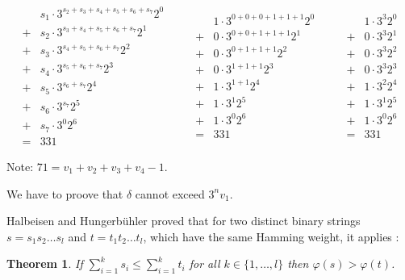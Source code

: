 \documentclass[12pt]{amsart}
\newtheorem{theorem}{Theorem}
\theoremstyle{definition}
\begin{document}
\[
\begin{array}{ll}
&s_1\cdot3^{s_2+s_3+s_4+s_5+s_6+s_7}2^0\\
+&s_2\cdot3^{s_3+s_4+s_5+s_6+s_7}2^1\\
+&s_3\cdot3^{s_4+s_5+s_6+s_7}2^2\\
+&s_4\cdot3^{s_5+s_6+s_7}2^3\\
+&s_5\cdot3^{s_6+s_7}2^4\\
+&s_6\cdot3^{s_7}2^5\\
+&s_7\cdot3^{0}2^6\\
=&331
\end{array}\qquad
\begin{array}{ll}
&1\cdot3^{0+0+0+1+1+1}2^0\\
+&0\cdot3^{0+0+1+1+1}2^1\\
+&0\cdot3^{0+1+1+1}2^2\\
+&0\cdot3^{1+1+1}2^3\\
+&1\cdot3^{1+1}2^4\\
+&1\cdot3^{1}2^5\\
+&1\cdot3^{0}2^6\\
=&331
\end{array}\qquad
\begin{array}{ll}
&1\cdot3^{3}2^0\\
+&0\cdot3^{3}2^1\\
+&0\cdot3^{3}2^2\\
+&0\cdot3^{3}2^3\\
+&1\cdot3^{2}2^4\\
+&1\cdot3^{1}2^5\\
+&1\cdot3^{0}2^6\\
=&331
\end{array}
\]

Note: $71=v_1+v_2+v_3+v_4-1$.

\par\medskip\noindent
We have to proove that $\delta$ cannot exceed $3^nv_1$.

\par\medskip\noindent
Halbeisen and Hungerbühler proved that for two distinct binary strings $s=s_1s_2\ldots s_l$ and $t=t_1t_2\ldots t_l$, which have the same Hamming weight, it applies \cite{Halbeisen_Hungerbuehler_1997}:

\begin{theorem}
\label{theo:HH_1}
If $\sum_{i=1}^{k}s_i\le\sum_{i=1}^{k}t_i$ for all $k\in\{1,\ldots,l\}$ then $\varphi(s)>\varphi(t)$.
\end{theorem}
\end{document}
